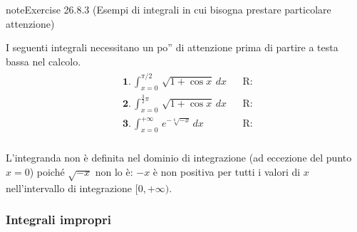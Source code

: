 \documentclass[letterpaper,10pt,italian]{jupyterBook}
\begin{document}
\sphinxAtStartPar
{}

\sphinxAtStartPar
{}

\sphinxAtStartPar
{}

\sphinxAtStartPar
{}
 \label{exercise:ex:integrals:definite:attention}

\begin{sphinxadmonition}{note}{Exercise 26.8.3 (Esempi di integrali in cui bisogna prestare particolare attenzione)}



\sphinxAtStartPar
I seguenti integrali necessitano un po” di attenzione prima di partire a testa bassa nel calcolo.
\begin{equation*}
\begin{split}\begin{aligned}
 & \mathbf{1.} \,  \int_{x=0}^{\pi/2} \, \sqrt{1 + \cos x} \, dx && \text{R: }  \\
 & \mathbf{2.} \,  \int_{x=0}^{\frac{3}{2}\pi} \, \sqrt{1 + \cos x} \, dx && \text{R: }  \\
 & \mathbf{3.} \,  \int_{x=0}^{+\infty} \, e^{-\sqrt[6]{-x}} \, dx && \text{R: }  \\
\end{aligned}\end{split}
\end{equation*}\end{sphinxadmonition}

\sphinxAtStartPar
{}

\sphinxAtStartPar
{}

\sphinxAtStartPar
{}
L’integranda non è definita nel dominio di integrazione (ad eccezione del punto \(x=0\)) poiché \(\sqrt{-x}\) non lo è: \(-x\) è non positiva per tutti i valori di \(x\) nell’intervallo di integrazione \([0,+\infty)\).


\subsubsection{Integrali impropri}
\label{\detokenize{ch/infinitesimal_calculus/integrals-problems:integrali-impropri}} \label{exercise:ch/infinitesimal_calculus/integrals-problems-exercise-3}
\end{document}
